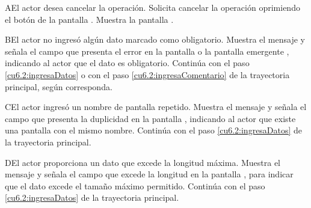  \begin{UCtrayectoriaA}{A}{El actor desea cancelar la operación.}
    \UCpaso[\UCactor] Solicita cancelar la operación oprimiendo el botón  de la pantalla .
    \UCpaso[\UCsist] Muestra la pantalla .
 \end{UCtrayectoriaA} 
 \begin{UCtrayectoriaA}{B}{El actor no ingresó algún dato marcado como obligatorio.}
    \UCpaso[\UCsist] Muestra el mensaje  y señala el campo que presenta el error en la pantalla 
	     o la pantalla emergente , indicando al actor que el dato es obligatorio.
    \UCpaso[] Continúa con el paso \ref{cu6.2:ingresaDatos} o con el paso \ref{cu6.2:ingresaComentario} de la trayectoria principal, según corresponda.
 \end{UCtrayectoriaA}
 \begin{UCtrayectoriaA}{C}{El actor ingresó un nombre de pantalla repetido.}
    \UCpaso[\UCsist] Muestra el mensaje  y señala el campo que presenta la duplicidad en la pantalla 
	    , indicando al actor que existe una pantalla con el mismo nombre.
    \UCpaso[] Continúa con el paso \ref{cu6.2:ingresaDatos} de la trayectoria principal.
 \end{UCtrayectoriaA}
 
 \begin{UCtrayectoriaA}{D}{El actor proporciona un dato que excede la longitud máxima.}
    \UCpaso[\UCsist] Muestra el mensaje  y señala el campo que excede la 
    longitud en la pantalla , para indicar que el dato excede el tamaño máximo permitido.
    \UCpaso[] Continúa con el paso \ref{cu6.2:ingresaDatos} de la trayectoria principal.
 \end{UCtrayectoriaA}
 

